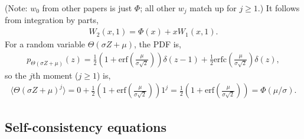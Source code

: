 \documentclass[10pt]{article}
\begin{document}
(Note: $w_0$ from other papers is just $\Phi$; all other $w_j$ match up for $j \geq 1$.)
It follows from integration by parts,
\begin{align}
	W_2(x,1) = \Phi(x) + x W_1(x,1).
	\label{intByPartsID}
\end{align}
For a random variable $\Theta(\sigma Z + \mu)$, the PDF is,
\begin{align}
	p_{\Theta(\sigma Z + \mu)} (z)
	=
	\frac{1}{2}
	(
		1 + \mathrm{erf}\left(
			\frac{\mu}{\sigma\sqrt{2}}
		\right)
	)
	\delta(z-1)
	+
	\frac{1}{2}
	\mathrm{erfc}\left(
			\frac{\mu}{\sigma\sqrt{2}}
		\right)
	\delta(z),
\end{align}
so the $j$th moment ($j \geq 1$) is,
\begin{align}
	\langle\Theta(\sigma Z + \mu)^j\rangle
	=
	0
	+
	\frac{1}{2}
	(
		1 + \mathrm{erf}\left(
			\frac{\mu}{\sigma\sqrt{2}}
		\right)
	) 1^j
	=
	\frac{1}{2}
	(
		1 + \mathrm{erf}\left(
			\frac{\mu}{\sigma\sqrt{2}}
		\right)
	)
	=
	\Phi(\mu/\sigma).
\end{align}

\subsection{Self-consistency equations}
\end{document}
